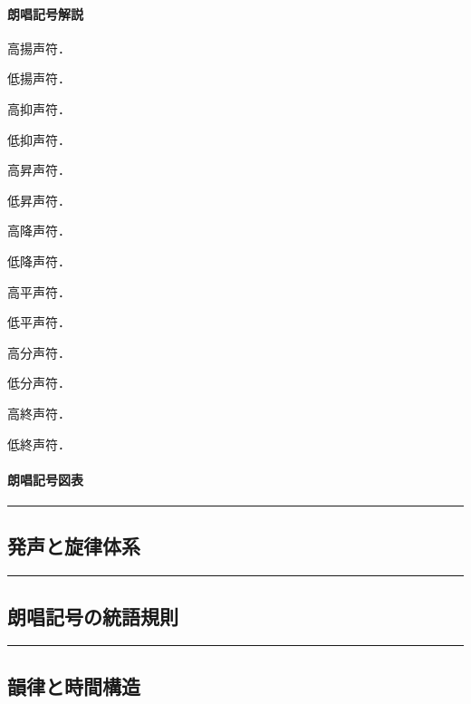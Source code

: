 \documentclass[
  japanese,
]{article}
\providecommand{\tightlist}{%
  \setlength{\itemsep}{0pt}\setlength{\parskip}{0pt}}
\begin{document}
\paragraph{朗唱記号解説}\label{subsection3.1.1}

\begin{description}
\tightlist
\item[{◌́}]
高揚声符．
\item[{◌̗}]
低揚声符．
\item[{◌̀}]
高抑声符．
\item[{◌̖}]
低抑声符．
\item[{◌̂}]
高昇声符．
\item[{◌̭}]
低昇声符．
\item[{◌̌}]
高降声符．
\item[{◌̬}]
低降声符．
\item[{◌̄}]
高平声符．
\item[{◌̱}]
低平声符．
\item[{◌̈}]
高分声符．
\item[{◌̤}]
低分声符．
\item[{◌̇}]
高終声符．
\item[{◌̣}]
低終声符．
\end{description}

\paragraph{朗唱記号図表}\label{subsection3.1.2}

\begin{center}\rule{0.5\linewidth}{0.5pt}\end{center}

\subsection{発声と旋律体系}\label{chapter4}

\begin{center}\rule{0.5\linewidth}{0.5pt}\end{center}

\subsection{朗唱記号の統語規則}\label{chapter5}

\begin{center}\rule{0.5\linewidth}{0.5pt}\end{center}

\subsection{韻律と時間構造}\label{chapter6}
\end{document}
